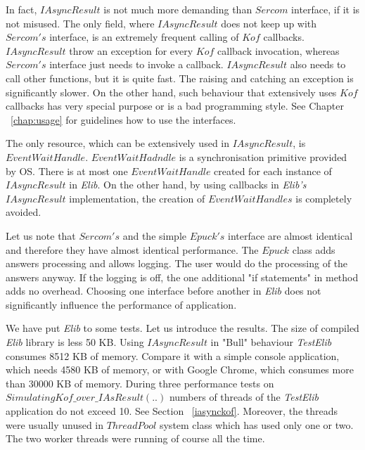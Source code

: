   In fact, $IAsyncResult$ is not much more demanding than $Sercom$ interface, if it is not misused.
  The only field, where $IAsyncResult$ does not keep up with $Sercom's$ interface, 
  is an extremely frequent calling of $Kof$ callbacks.
  $IAsyncResult$ throw an exception for every $Kof$ callback invocation, 
  whereas $Sercom's$ interface just needs to invoke a callback.
  $IAsyncResult$ also needs to call other functions, but it is quite fast. 
  The raising and catching an exception is significantly slower.
  On the other hand, such behaviour that extensively uses $Kof$ callbacks 
  has very special purpose or is a bad programming style.
  See Chapter ~\ref{chap:usage} for guidelines how to use the interfaces.

  The only resource, which can be extensively used in $IAsyncResult$, is $EventWaitHandle$. 
  $EventWaitHadndle$ is a synchronisation primitive provided
  by OS. There is at most one $EventWaitHandle$ created for each instance of $IAsyncResult$ in {\it Elib}. 
  On the other hand, by using callbacks in {\it Elib's} $IAsyncResult$
  implementation, the creation of $EventWaitHandles$ is completely avoided.

  Let us note that $Sercom's$ and the simple $Epuck's$ interface 
  are almost identical and therefore they have almost identical performance.
  The $Epuck$ class adds answers processing and allows logging. The user would do the processing of the answers anyway.
  If the logging is off, the one additional "if statements" in method adds no overhead. 
  Choosing one interface before another in {\it Elib} does not significantly influence the performance of application.

  We have put {\it Elib} to some tests. Let us introduce the results.
  The size of compiled {\it Elib} library is less 50 KB.
  Using $IAsyncResult$ in "Bull" behaviour  {\it TestElib} consumes 8512 KB of memory.
  Compare it with a simple console application, which needs 4580 KB of memory, or with Google Chrome, 
  which consumes more than 30000 KB of memory.
  During three performance tests on $SimulatingKof\_over\_IAsResult(..)$
  numbers of threads of the {\it TestElib} application do not exceed 10. 
  See Section ~\ref{iasynckof}. Moreover, the threads were usually unused
  in $ThreadPool$ system class which has used only one or two. 
  The two worker threads were running of course all the time.

